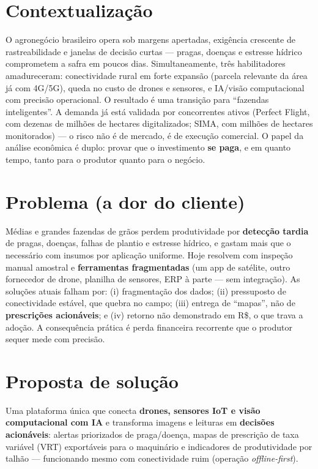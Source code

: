 \documentclass[12pt,a4paper]{article}
\newcommand{\rs}{R\$}
\begin{document}
\section{Contextualização}
O agronegócio brasileiro opera sob margens apertadas, exigência crescente de rastreabilidade e janelas de decisão curtas --- pragas, doenças e estresse hídrico comprometem a safra em poucos dias. Simultaneamente, três habilitadores amadureceram: conectividade rural em forte expansão (parcela relevante da área já com 4G/5G), queda no custo de drones e sensores, e IA/visão computacional com precisão operacional. O resultado é uma transição para ``fazendas inteligentes''. A demanda já está validada por concorrentes ativos (Perfect Flight, com dezenas de milhões de hectares digitalizados; SIMA, com milhões de hectares monitorados) --- o risco não é de mercado, é de execução comercial. O papel da análise econômica é duplo: provar que o investimento \textbf{se paga}, e em quanto tempo, tanto para o produtor quanto para o negócio.

\section{Problema (a dor do cliente)}
Médias e grandes fazendas de grãos perdem produtividade por \textbf{detecção tardia} de pragas, doenças, falhas de plantio e estresse hídrico, e gastam mais que o necessário com insumos por aplicação uniforme. Hoje resolvem com inspeção manual amostral e \textbf{ferramentas fragmentadas} (um app de satélite, outro fornecedor de drone, planilha de sensores, ERP à parte --- sem integração). As soluções atuais falham por: (i) fragmentação dos dados; (ii) pressuposto de conectividade estável, que quebra no campo; (iii) entrega de ``mapas'', não de \textbf{prescrições acionáveis}; e (iv) retorno não demonstrado em \rs, o que trava a adoção. A consequência prática é perda financeira recorrente que o produtor sequer mede com precisão.

\section{Proposta de solução}
Uma plataforma única que conecta \textbf{drones, sensores IoT e visão computacional com IA} e transforma imagens e leituras em \textbf{decisões acionáveis}: alertas priorizados de praga/doença, mapas de prescrição de taxa variável (VRT) exportáveis para o maquinário e indicadores de produtividade por talhão --- funcionando mesmo com conectividade ruim (operação \textit{offline-first}).
\end{document}
